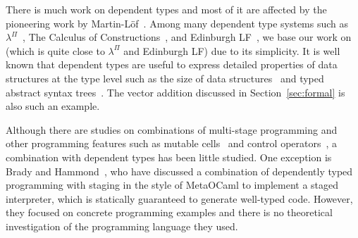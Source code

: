 





There is much work on dependent types and most of it are affected by
the pioneering work by Martin-L\"{o}f~\cite{martin1973intuitionistic}.
Among many dependent type systems such as
$\lambda^\Pi$~\cite{Meyer1986}, The Calculus of
Constructions~\cite{coquand:inria-00076024}, and Edinburgh
LF~\cite{harper1993framework}, we base our work on \LLF~\cite{attapl}
(which is quite close to $\lambda^\Pi$ and Edinburgh LF) due to its
simplicity.  It is well known that dependent types are useful to
express detailed properties of data structures at the type level such
as the size of data structures~\cite{Xi98} and typed abstract syntax
trees~\cite{DBLP:conf/dsl/LeijenM99,DBLP:conf/popl/XiCC03}.  The
vector addition discussed in Section~\ref{sec:formal} is also such an
example.




Although there are studies on combinations of multi-stage programming and
other programming features such as mutable cells~\cite{kiselyov2016refined} and
control operators~\cite{KameyamaKiselyovShan09PEPM,oishi2017staging}, a
combination with dependent types has been little studied. One exception is
Brady and Hammond~\cite{brady2006dependently}, who have discussed a
combination of dependently typed programming with staging in the style of
MetaOCaml to implement a staged interpreter, which is statically guaranteed
to generate well-typed code. However, they focused on concrete programming
examples and there is no theoretical investigation of the programming
language they used.


